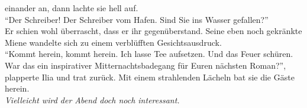  einander an, dann lachte sie hell auf. \\
``Der Schreiber! Der Schreiber vom Hafen. Sind Sie ins Wasser gefallen?'' \\
Er schien wohl überrascht, dass er ihr gegenüberstand. Seine eben noch gekränkte Miene wandelte sich 
zu einem verblüfften Gesichtsausdruck. \\
``Kommt herein, kommt herein. Ich lasse Tee aufsetzen. Und das Feuer schüren. War das ein 
inspirativer Mitternachtsbadegang für Euren nächsten Roman?'', plapperte 
Ilia und trat zurück. Mit einem strahlenden Lächeln bat sie die Gäste herein. \\
\textit{Vielleicht wird der Abend doch noch interessant.}\\